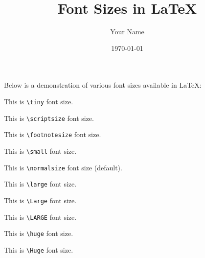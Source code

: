 \documentclass[12pt]{article}
\begin{document}
\title{Font Sizes in \LaTeX}
\author{Your Name}
\date{\today}
\maketitle

Below is a demonstration of various font sizes available in \LaTeX:

\bigskip

{\tiny This is \texttt{\textbackslash tiny} font size.}

\medskip

{\scriptsize This is \texttt{\textbackslash scriptsize} font size.}

\medskip

{\footnotesize This is \texttt{\textbackslash footnotesize} font size.}

\medskip

{\small This is \texttt{\textbackslash small} font size.}

\medskip

{\normalsize This is \texttt{\textbackslash normalsize} font size (default).}

\medskip

{\large This is \texttt{\textbackslash large} font size.}

\medskip

{\Large This is \texttt{\textbackslash Large} font size.}

\medskip

{\LARGE This is \texttt{\textbackslash LARGE} font size.}

\medskip

{\huge This is \texttt{\textbackslash huge} font size.}

\medskip

{\Huge This is \texttt{\textbackslash Huge} font size.}
\end{document}
